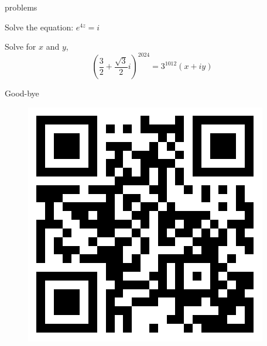 \documentclass[11pt]{beamer}
\theoremstyle{plain}
\begin{document}
\begin{frame}{problems}
    \begin{problem}
        Solve the equation: $e^{4z}=i$
    \end{problem}
    \begin{problem}
        Solve for $x$ and $y$,
        $$
        \left(\frac{3}{2}+\frac{\sqrt 3}{2}i\right)^{2024}=3^{1012}(x+iy)
        $$
    \end{problem}
\end{frame}
\begin{frame}{Good-bye}
    \begin{figure}
        \centering
        \includegraphics[width=0.5\linewidth]{qrcode.png}
    \end{figure}
\end{frame}
\end{document}
